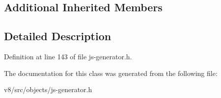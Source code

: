 \subsection*{Additional Inherited Members}


\subsection{Detailed Description}


Definition at line 143 of file js-\/generator.\+h.



The documentation for this class was generated from the following file\+:\begin{DoxyCompactItemize}
\item 
v8/src/objects/js-\/generator.\+h\end{DoxyCompactItemize}
